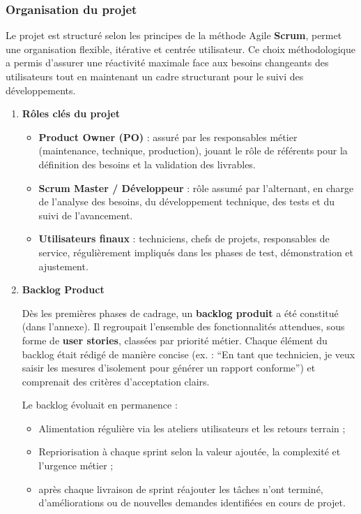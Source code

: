 \documentclass[11pt,a4paper]{article}
\begin{document}
\subsubsection{Organisation du projet}

Le projet est structuré selon les principes de la méthode Agile \textbf{Scrum}, permet une organisation flexible, itérative et centrée utilisateur. Ce choix méthodologique a permis d’assurer une réactivité maximale face aux besoins changeants des utilisateurs tout en maintenant un cadre structurant pour le suivi des développements.
\begin{enumerate}

\item \textbf{Rôles clés du projet}
\begin{itemize}
    \item \textbf{Product Owner (PO)} : assuré par les responsables métier (maintenance, technique, production), jouant le rôle de référents pour la définition des besoins et la validation des livrables.
    \item \textbf{Scrum Master / Développeur} : rôle assumé par l’alternant, en charge de l’analyse des besoins, du développement technique, des tests et du suivi de l'avancement.
    \item \textbf{Utilisateurs finaux} : techniciens, chefs de projets, responsables de service, régulièrement impliqués dans les phases de test, démonstration et ajustement.
    
\end{itemize}

\item \textbf{Backlog Product}

Dès les premières phases de cadrage, un \textbf{backlog produit} a été constitué (dans l'annexe). Il regroupait l’ensemble des fonctionnalités attendues, sous forme de \textbf{user stories}, classées par priorité métier. Chaque élément du backlog était rédigé de manière concise (ex. : “En tant que technicien, je veux saisir les mesures d’isolement pour générer un rapport conforme”) et comprenait des critères d’acceptation clairs.

Le backlog évoluait en permanence :
\begin{itemize}
    \item Alimentation régulière via les ateliers utilisateurs et les retours terrain ;
    \item Repriorisation à chaque sprint selon la valeur ajoutée, la complexité et l’urgence métier ;
    \item après chaque livraison de sprint réajouter les tâches n'ont terminé, d’améliorations ou de nouvelles demandes identifiées en cours de projet.
\end{itemize}


\end{enumerate}
\end{document}
